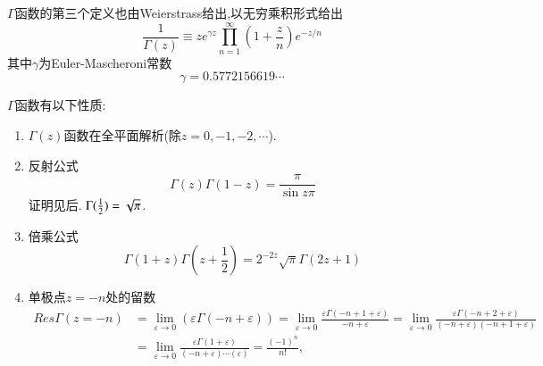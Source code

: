 $\Gamma$函数的第三个定义也由Weierstrass给出,以无穷乘积形式给出
\begin{equation}
\frac{1}{\Gamma(z)} \equiv z e^{\gamma z} \prod_{n=1}^{\infty}\left(1+\frac{z}{n}\right) e^{-z / n}
\end{equation}
其中$\gamma$为Euler-Mascheroni常数
$$
\gamma=0.5772156619 \cdots
$$

$\Gamma$函数有以下性质:
\begin{enumerate}
    \item $\Gamma(z)$函数在全平面解析(除$z=0, -1, -2, \cdots$).
    \item 反射公式
    $$
        \Gamma(z) \Gamma(1-z)=\frac{\pi}{\sin z \pi}
    $$ 证明见后. $\Gamma({\frac{1}{2}}) = \sqrt{\pi}$.
    \item 倍乘公式
    $$
    \Gamma(1+z) \Gamma\left(z+\frac{1}{2}\right)=2^{-2 z} \sqrt{\pi} \Gamma(2 z+1)
    $$
    \item 单极点$z=-n$处的留数
    $$
    \begin{aligned}
    Res \Gamma(z=-n) & =\lim _{\varepsilon \rightarrow 0}(\varepsilon \Gamma(-n+\varepsilon))=\lim _{\varepsilon \rightarrow 0} \frac{\varepsilon \Gamma(-n+1+\varepsilon)}{-n+\varepsilon}=\lim _{\varepsilon \rightarrow 0} \frac{\varepsilon \Gamma(-n+2+\varepsilon)}{(-n+\varepsilon)(-n+1+\varepsilon)} \\
    & =\lim _{\varepsilon \rightarrow 0} \frac{\varepsilon \Gamma(1+\varepsilon)}{(-n+\varepsilon) \cdots(\varepsilon)}=\frac{(-1)^{n}}{n !},
    \end{aligned}
    $$
\end{enumerate}

